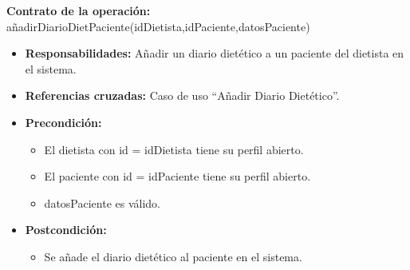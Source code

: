 \textbf{Contrato de la operación:} añadirDiarioDietPaciente(idDietista,idPaciente,datosPaciente)
\begin{itemize}
\item \textbf{Responsabilidades:} Añadir un diario dietético a un paciente del dietista en el sistema.
\item \textbf{Referencias cruzadas:} Caso de uso ``Añadir Diario Dietético''.
\item \textbf{Precondición:}
\begin{itemize}
\item El dietista con id = idDietista tiene su perfil abierto.
\item El paciente con id = idPaciente tiene su perfil abierto.
\item datosPaciente es válido.
\end{itemize}
\item \textbf{Postcondición:}
\begin{itemize}
\item Se añade el diario dietético al paciente en el sistema.
\end{itemize}
\end{itemize}


